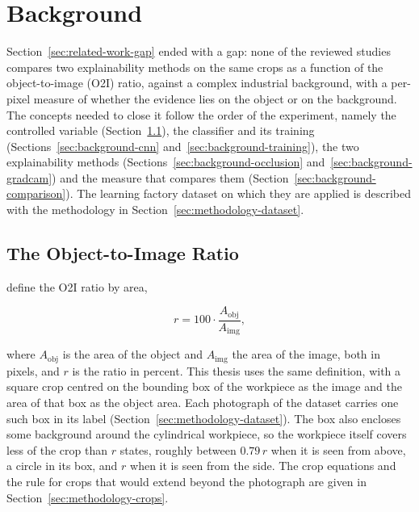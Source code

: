 \chapter{Background}
\label{sec:background}

Section~\ref{sec:related-work-gap} ended with a gap: none of the reviewed studies
compares two explainability methods on the same crops as a function of the
object-to-image (O2I) ratio, against a complex industrial background, with a per-pixel
measure of whether the evidence lies on the object or on the background. The concepts
needed to close it follow the order of the experiment, namely the controlled variable
(Section~\ref{sec:background-o2i}), the classifier and its training
(Sections~\ref{sec:background-cnn} and~\ref{sec:background-training}), the two
explainability methods (Sections~\ref{sec:background-occlusion}
and~\ref{sec:background-gradcam}) and the measure that compares them
(Section~\ref{sec:background-comparison}). The learning factory dataset on which they are
applied is described with the methodology in Section~\ref{sec:methodology-dataset}.

\section{The Object-to-Image Ratio}
\label{sec:background-o2i}

\citet{pawlowski2019needles} define the O2I ratio by area,

\begin{equation}
r = 100 \cdot \frac{A_{\mathrm{obj}}}{A_{\mathrm{img}}},
\label{eq:bg-o2i}
\end{equation}

where $A_{\mathrm{obj}}$ is the area of the object and $A_{\mathrm{img}}$ the area of
the image, both in pixels, and $r$ is the ratio in percent. This thesis uses the same
definition, with a square crop centred on the bounding box of the workpiece as the image and the
area of that box as the object area. Each photograph of the dataset carries one such box
in its label (Section~\ref{sec:methodology-dataset}). The box also encloses some background around the
cylindrical workpiece, so the workpiece itself covers less of the crop than $r$ states,
roughly between $0.79\,r$ when it is seen from above, a circle in its box, and $r$ when
it is seen from the side. The crop equations and the rule for crops that would extend beyond the
photograph are given in Section~\ref{sec:methodology-crops}.


